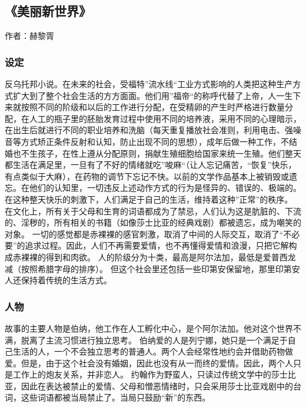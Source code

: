 \subsection{《美丽新世界》}
作者：赫黎胥

\subsubsection{设定}
反乌托邦小说。在未来的社会，受福特”流水线“工业方式影响的人类把这种生产方式扩大到了整个社会生活的方方面面。他们用”福帝“的称呼代替了上帝，人一生下来就按照不同的阶级和以后的工作进行分配，在受精卵的产生时严格进行数量分配，在人工的瓶子里的胚胎发育过程中使用不同的培养液，采用不同的心理暗示，在出生后就进行不同的职业培养和洗脑（每天重复播放社会准则，利用电击、强噪音等方式矫正条件反射和认知，防止出现不同的思想），成年后做一种工作，不结婚也不生孩子，在性上遵从分配原则，捐献生殖细胞给国家来统一生殖。他们整天都生活在满足里，一旦有了不好的情绪就吃”唆麻“（让人忘记痛苦，“恢复”快乐，有点类似于大麻），在药物的调节下忘记不快。以前的文学作品基本上被销毁或遗忘。在他们的认知里，一切违反上述动作方式的行为是怪异的、错误的、极端的。在这种整天快乐的刺激下，人们满足于自己的生活，维持着这种”正常”的秩序。
在文化上，所有关于父母和生育的词语都成为了禁忌，人们认为这是肮脏的、下流的、淫秽的，所有相关的书籍（如像莎士比亚的经典戏剧）都被遗忘，成为嘲笑的对象。
一切的感觉都是赤裸裸的感官刺激，取消了中间的人际交互，取消了“不必要”的追求过程。因此，人们不再需要爱情，也不再懂得爱情和浪漫，只把它解构成赤裸裸的得到和肉欲。
人的阶级分为十类，最高是阿尔法加，最低是爱普西龙减（按照希腊字母的排序）。
但这个社会里还包括一些印第安保留地，那里印第安人还保持着传统的生活方式。

\subsubsection{人物}
故事的主要人物是伯纳，他工作在人工孵化中心，是个阿尔法加。他对这个世界不满，脱离了主流习惯进行独立思考。
伯纳爱的人是列宁娜，她只是一个满足于自己生活的人，一个不会独立思考的普通人。两个人会经常性地约会并借助药物做爱。但是，由于这个社会没有婚姻，因此也没有从一而终的爱情。因此，两个人只是工作上的炮友关系，并非恋人。
约翰作为野蛮人，只读过传统文学中的莎士比亚，因此在表达被禁止的爱情、父母和憎恶情绪时，只会采用莎士比亚戏剧中的台词，这些词语都被当局禁止了。当局只鼓励“新”的东西。

